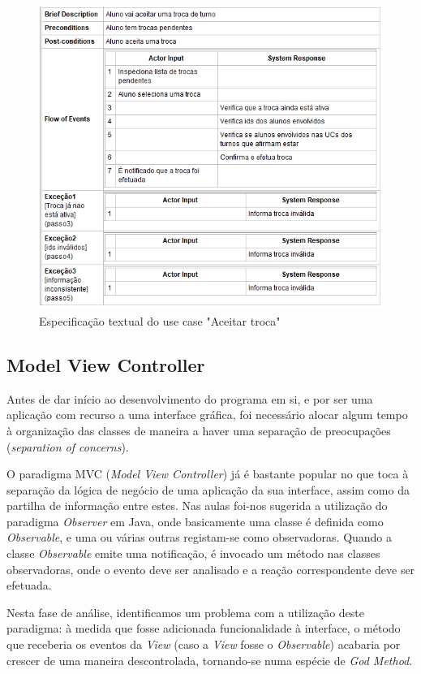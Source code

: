 \documentclass[a4paper]{article}
\begin{document}
\begin{figure}[H]
\centering
\includegraphics[width=14cm]{UCAceitarTroca}
\caption{Especificação textual do use case "Aceitar troca"}
\label{}
\end{figure}

\pagebreak

\subsection{Model View Controller}
\hspace{3mm}Antes de dar início ao desenvolvimento do programa em si, e por ser uma aplicação com recurso a uma interface gráfica, foi necessário alocar algum tempo à organização das classes de maneira a haver uma separação de preocupações (\emph{separation of concerns}).

O paradigma MVC (\emph{Model View Controller}) já é bastante popular no que toca à separação da lógica de negócio de uma aplicação da sua interface, assim como da partilha de informação entre estes. Nas aulas foi-nos sugerida a utilização do paradigma \emph{Observer} em Java, onde basicamente uma classe é definida como \emph{Observable}, e uma ou várias outras registam-se como observadoras. Quando a classe \emph{Observable} emite uma notificação, é invocado um método nas classes observadoras, onde o evento deve ser analisado e a reação correspondente deve ser efetuada.

Nesta fase de análise, identificamos um problema com a utilização deste paradigma: à medida que fosse adicionada funcionalidade à interface, o método que receberia os eventos da \emph{View} (caso a \emph{View} fosse o \emph{Observable}) acabaria por crescer de uma maneira descontrolada, tornando-se numa espécie de \emph{God Method}.
\end{document}
